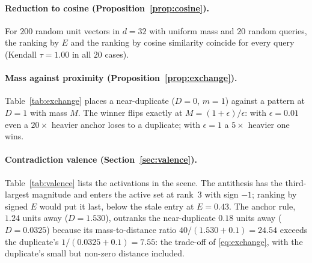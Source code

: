 \documentclass[11pt]{article}
\theoremstyle{remark}
\newcommand{\act}{E}
\begin{document}
\paragraph{Reduction to cosine (Proposition~\ref{prop:cosine}).}
For $200$ random unit vectors in $d=32$ with uniform mass and $20$ random queries, the ranking by $\act$ and the ranking by cosine similarity coincide for every query (Kendall $\tau=1.00$ in all $20$ cases).

\paragraph{Mass against proximity (Proposition~\ref{prop:exchange}).}
Table~\ref{tab:exchange} places a near-duplicate ($D=0$, $m=1$) against a pattern at $D=1$ with mass $M$. The winner flips exactly at $M=(1+\epsilon)/\epsilon$: with $\epsilon=0.01$ even a $20\times$ heavier anchor loses to a duplicate; with $\epsilon=1$ a $5\times$ heavier one wins.

\begin{table}[htbp]
  \centering
  \caption{Mass--proximity exchange: which pattern activates more strongly, a near-duplicate of the query with mass $1$ or a pattern at distance $D=1$ with mass $M$, as a function of $\epsilon$.}
  \label{tab:exchange}
  
\end{table}

\paragraph{Contradiction valence (Section~\ref{sec:valence}).}
Table~\ref{tab:valence} lists the activations in the scene. The antithesis has the third-largest magnitude and enters the active set at rank~3 with sign $-1$; ranking by signed $\act$ would put it last, below the stale entry at $\act=0.43$. The anchor rule, $1.24$ units away ($D=1.530$), outranks the near-duplicate $0.18$ units away ($D=0.0325$) because its mass-to-distance ratio $40/(1.530+0.1)=24.54$ exceeds the duplicate's $1/(0.0325+0.1)=7.55$: the trade-off of \eqref{eq:exchange}, with the duplicate's small but non-zero distance included.

\begin{table}[htbp]
  \centering
  \caption{Activations in the toy scene for the query at the origin, ordered by $|\act|$. The sign is the valence label handed to the rule core.}
  \label{tab:valence}
  
\end{table}
\end{document}
